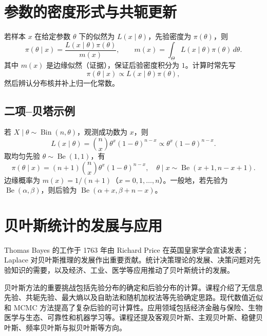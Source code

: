 \section*{参数的密度形式与共轭更新}
若样本 $x$ 在给定参数 $\theta$ 下的似然为 $L(x\mid\theta)$，先验密度为 $\pi(\theta)$，则
\[
\pi(\theta\mid x)=\frac{L(x\mid\theta)\pi(\theta)}{m(x)},\qquad
m(x)=\int_\Theta L(x\mid\theta)\pi(\theta)\,d\theta.
\]
其中 $m(x)$ 是边缘似然（证据），保证后验密度积分为 $1$。计算时常先写
\[
\pi(\theta\mid x)\propto L(x\mid\theta)\pi(\theta),
\]
然后辨认分布核并补上归一化常数。

\subsection*{二项--贝塔示例}
若 $X\mid\theta\sim\operatorname{Bin}(n,\theta)$，观测成功数为 $x$，则
\[
L(x\mid\theta)=\binom{n}{x}\theta^x(1-\theta)^{n-x}\propto\theta^x(1-\theta)^{n-x}.
\]
取均匀先验 $\theta\sim\operatorname{Be}(1,1)$，有
\[
\pi(\theta\mid x)=(n+1)\binom{n}{x}\theta^x(1-\theta)^{n-x},\quad
\theta\mid x\sim\operatorname{Be}(x+1,n-x+1).
\]
边缘概率为 $m(x)=1/(n+1)$（$x=0,1,\ldots,n$）。一般地，若先验为 $\operatorname{Be}(\alpha,\beta)$，则后验为 $\operatorname{Be}(\alpha+x,\beta+n-x)$。

\section*{贝叶斯统计的发展与应用}
Thomas Bayes 的工作于 1763 年由 Richard Price 在英国皇家学会宣读发表；Laplace 对贝叶斯推理的发展作出重要贡献。统计决策理论的发展、决策问题对先验知识的需要，以及经济、工业、医学等应用推动了贝叶斯统计的发展。

贝叶斯方法的重要挑战包括先验分布的确定和后验分布的计算。课程介绍了无信息先验、共轭先验、最大熵以及自助法和随机加权法等先验确定思路。现代数值近似和 MCMC 方法提高了复杂后验的可计算性。应用领域包括经济金融与保险、生物医学与生态、可靠性和机器学习等。课程还提及客观贝叶斯、主观贝叶斯、稳健贝叶斯、频率贝叶斯与拟贝叶斯等方向。
